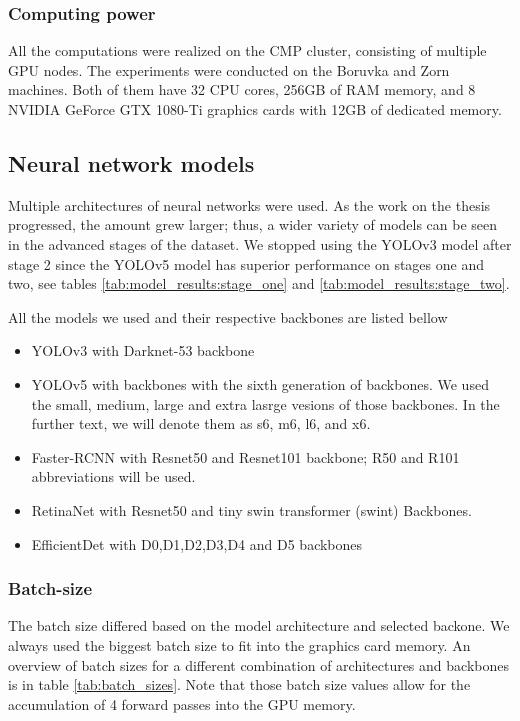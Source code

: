\subsubsection{Computing power}
All the computations were realized on the CMP cluster, consisting of multiple GPU nodes. The experiments were conducted on the Boruvka and Zorn machines. Both of them have 32 CPU cores, 256GB of RAM memory, and 8 NVIDIA GeForce GTX 1080-Ti graphics cards with 12GB of dedicated memory.

\subsection{Neural network models}
\label{sec:methods:nns}
Multiple architectures of neural networks were used. As the work on the thesis progressed, the amount grew larger; thus, a wider variety of models can be seen in the advanced stages of the dataset. We stopped using the YOLOv3 model after stage 2 since the YOLOv5 model has superior performance on stages one and two, see tables \ref{tab:model_results:stage_one} and \ref{tab:model_results:stage_two}.

All the models we used and their respective backbones are listed bellow
\begin{itemize}
    \item YOLOv3 with Darknet-53 backbone
    \item YOLOv5 with backbones with the sixth generation of backbones. We used the small, medium, large and extra lasrge vesions of those backbones. In the further text, we will denote them as s6, m6, l6, and x6.
    \item Faster-RCNN with Resnet50 and Resnet101 backbone; R50 and R101 abbreviations will be used.
    \item RetinaNet with Resnet50 and tiny swin transformer (swint) Backbones.
    \item EfficientDet with D0,D1,D2,D3,D4 and D5 backbones
\end{itemize}

\subsubsection{Batch-size}
The batch size differed based on the model architecture and selected backone. We always used the biggest batch size to fit into the graphics card memory. An overview of batch sizes for a different combination of architectures and backbones is in table \ref{tab:batch_sizes}. Note that those batch size values allow for the accumulation of 4 forward passes into the GPU memory.

